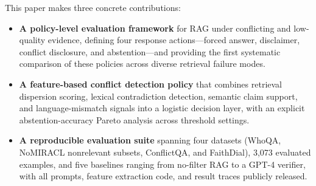 This paper makes three concrete contributions:
\begin{itemize}
    \item \textbf{A policy-level evaluation framework} for RAG under conflicting and low-quality evidence, defining four response actions---forced answer, disclaimer, conflict disclosure, and abstention---and providing the first systematic comparison of these policies across diverse retrieval failure modes.
    \item \textbf{A feature-based conflict detection policy} that combines retrieval dispersion scoring, lexical contradiction detection, semantic claim support, and language-mismatch signals into a logistic decision layer, with an explicit abstention-accuracy Pareto analysis across threshold settings.
    \item \textbf{A reproducible evaluation suite} spanning four datasets (WhoQA, NoMIRACL nonrelevant subsets, ConflictQA, and FaithDial), 3,073 evaluated examples, and five baselines ranging from no-filter RAG to a GPT-4 verifier, with all prompts, feature extraction code, and result traces publicly released.
\end{itemize}
